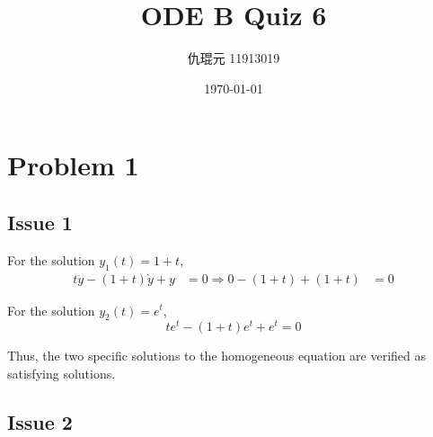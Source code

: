 \documentclass[utf8]{ctexart}
\begin{document}
\title{ODE B Quiz 6}
\author{仇琨元 11913019}
\date{\today}
\maketitle

\section{Problem 1}

\subsection{Issue 1}

For the solution \(y_1 (t)=1+t\),
\begin{equation}
	\begin{aligned}
		t\ddot{y}-(1+t)\dot{y}+y  & =0
		\Rightarrow 0-(1+t)+(1+t) & =0
	\end{aligned}
\end{equation}

For the solution \(y_2 (t)=e^{t}\),
\begin{equation}
	te^{t}-(1+t)e^{t}+e^{t}=0
\end{equation}

Thus, the two specific solutions to the homogeneous equation are verified as satisfying solutions.

\subsection{Issue 2}
\end{document}
